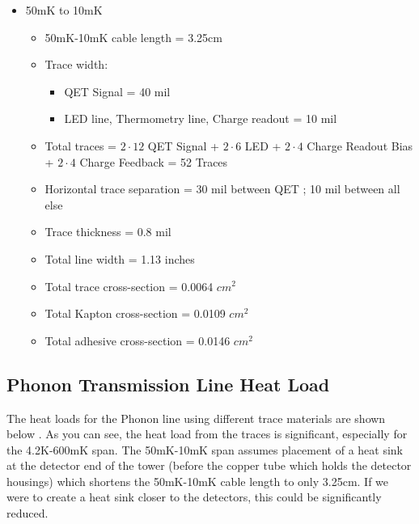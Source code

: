 \documentclass{article}
\begin{document}
\begin{itemize}
\item 50mK to 10mK
    \begin{itemize}
    \item 50mK-10mK cable length = 3.25cm
    \item Trace width:
        \begin{itemize}
        \item QET Signal = 40 mil
        \item LED line, Thermometry line, Charge readout = 10 mil
        \end{itemize}
    \item Total traces = $2\cdot12$ QET Signal + $2\cdot6$ LED + $2\cdot4$ Charge Readout Bias + $2\cdot4$ Charge Feedback = 52 Traces
    \item Horizontal trace separation = 30 mil between QET ; 10 mil between all else
    \item Trace thickness = 0.8 mil
    \item Total line width = 1.13 inches
    \item Total trace cross-section = 0.0064 $cm^2$
    \item Total Kapton cross-section = 0.0109 $cm^2$
    \item Total adhesive cross-section = 0.0146 $cm^2$
    \end{itemize}
\end{itemize}

\subsection{Phonon Transmission Line Heat Load}

The heat loads for the Phonon line using different trace materials are shown below \footnotemark. As you can see, the heat load from the traces is significant, especially for the 4.2K-600mK span.
The 50mK-10mK span assumes placement of a heat sink at the detector end of the tower (before the copper tube which holds the detector housings) which shortens the 50mK-10mK cable length to only 3.25cm. If we were to create a heat sink closer to the detectors, this could be significantly reduced.
\end{document}
